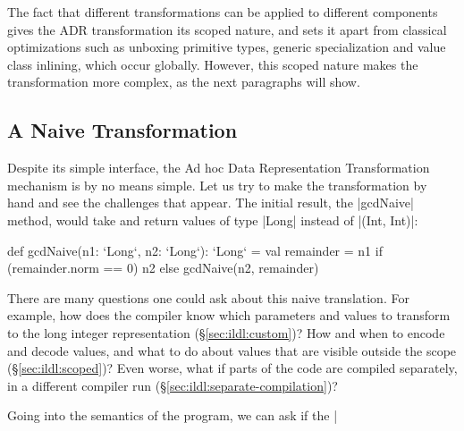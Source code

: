 The fact that different transformations can be applied to different components gives the ADR transformation its scoped nature, and sets it apart from classical optimizations such as unboxing primitive types, generic specialization and value class inlining, which occur globally. However, this scoped nature makes the transformation more complex, as the next paragraphs will show.



\subsection{A Naive Transformation}



Despite its simple interface, the Ad hoc Data Representation Transformation mechanism is by no means simple. Let us try to make the transformation by hand and see the challenges that appear. The initial result, the |gcdNaive| method, would take and return values of type |Long| instead of |(Int, Int)|:

\begin{lstlisting-nobreak}
def gcdNaive(n1: `Long`, n2: `Long`): `Long` = {
  val remainder = n1 %
  if (remainder.norm == 0) n2 else gcdNaive(n2, remainder)
}
\end{lstlisting-nobreak}

There are many questions one could ask about this naive translation. For example, how does the compiler know which parameters and values to transform to the long integer representation (\S\ref{sec:ildl:custom})? How and when to encode and decode values, and what to do about values that are visible outside the scope (\S\ref{sec:ildl:scoped})? Even worse, what if parts of the code are compiled separately, in a different compiler run (\S\ref{sec:ildl:separate-compilation})?

Going into the semantics of the program, we can ask if the |%

